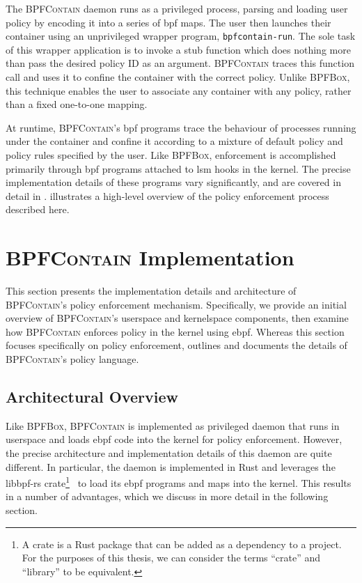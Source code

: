 \documentclass[
  fontsize=12pt,
  titlepage=firstiscover,
  paper=letter,
oneside,
  cleardoublepage=plain,
  parskip=half-,
  DIV=10,
  parindent,
  appendixprefix,
  chapterprefix,
  listof=totoc,
]{scrbook}
\newcommand{\bpfbox}{\textsc{BPFBox}}
\newcommand{\bpfcontain}{\textsc{BPFContain}}
\begin{document}
The \bpfcontain{} daemon runs as a privileged process, parsing and loading user policy by
encoding it into a series of \gls{bpf} maps. The user then launches their container using
an unprivileged wrapper program, \texttt{bpfcontain-run}. The sole task of this wrapper
application is to invoke a stub function which does nothing more than pass the desired
policy ID as an argument. \bpfcontain{} traces this function call and uses it to confine
the container with the correct policy. Unlike \bpfbox{}, this technique enables the user
to associate any container with any policy, rather than a fixed one-to-one mapping.

At runtime, \bpfcontain{}'s \gls{bpf} programs trace the behaviour of processes running
under the container and confine it according to a mixture of default policy and policy
rules specified by the user. Like \bpfbox{}, enforcement is accomplished primarily through
\gls{bpf} programs attached to \gls{lsm} hooks in the kernel. The precise implementation
details of these programs vary significantly, and are covered in detail in
.  illustrates
a high-level overview of the policy enforcement process described here.



\section{\bpfcontain{} Implementation}\label{s:bpfcontain-implementation}

This section presents the implementation details and architecture of \bpfcontain{}'s
policy enforcement mechanism. Specifically, we provide an initial overview of
\bpfcontain{}'s userspace and kernelspace components, then examine how \bpfcontain{}
enforces policy in the kernel using \gls{ebpf}. Whereas this section focuses specifically
on policy enforcement,  outlines and documents the details of
\bpfcontain{}'s policy language.

\subsection{Architectural Overview}\label{ss:bpfcontain-architecture}

Like \bpfbox{}, \bpfcontain{} is implemented as privileged daemon that runs in userspace
and loads \gls{ebpf} code into the kernel for policy enforcement. However, the precise
architecture and implementation details of this daemon are quite different. In particular,
the daemon is implemented in Rust and leverages the libbpf-rs crate\footnote{A crate is
a Rust package that can be added as a dependency to a project. For the purposes of this
thesis, we can consider the terms \enquote{crate} and \enquote{library} to be
equivalent.}~\cite{libbpf-rs} to load its \gls{ebpf} programs and maps into the kernel.
This results in a number of advantages, which we discuss in more detail in the following
section.
\end{document}
